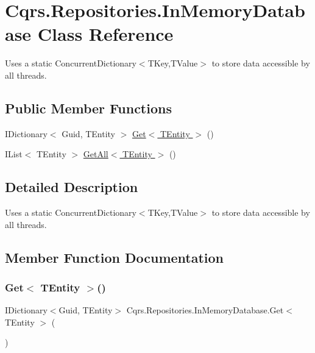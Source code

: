 \hypertarget{classCqrs_1_1Repositories_1_1InMemoryDatabase}{}\section{Cqrs.\+Repositories.\+In\+Memory\+Database Class Reference}
\label{classCqrs_1_1Repositories_1_1InMemoryDatabase}


Uses a static Concurrent\+Dictionary$<$\+T\+Key,\+T\+Value$>$ to store data accessible by all threads.  


\subsection*{Public Member Functions}
\begin{DoxyCompactItemize}
\item 
I\+Dictionary$<$ Guid, T\+Entity $>$ \hyperlink{classCqrs_1_1Repositories_1_1InMemoryDatabase_aef212725bb71dfe3a380de20843ed0e5}{Get$<$ T\+Entity $>$} ()
\item 
I\+List$<$ T\+Entity $>$ \hyperlink{classCqrs_1_1Repositories_1_1InMemoryDatabase_a83104b325c203f6768bb8ffd2c9c3381}{Get\+All$<$ T\+Entity $>$} ()
\end{DoxyCompactItemize}


\subsection{Detailed Description}
Uses a static Concurrent\+Dictionary$<$\+T\+Key,\+T\+Value$>$ to store data accessible by all threads. 



\subsection{Member Function Documentation}
\mbox{\label{classCqrs_1_1Repositories_1_1InMemoryDatabase_aef212725bb71dfe3a380de20843ed0e5}} 
\subsubsection{\texorpdfstring{Get$<$ T\+Entity $>$()}{Get< TEntity >()}}
{\footnotesize\ttfamily I\+Dictionary$<$Guid, T\+Entity$>$ Cqrs.\+Repositories.\+In\+Memory\+Database.\+Get$<$ T\+Entity $>$ (\begin{DoxyParamCaption}{ }\end{DoxyParamCaption})}

